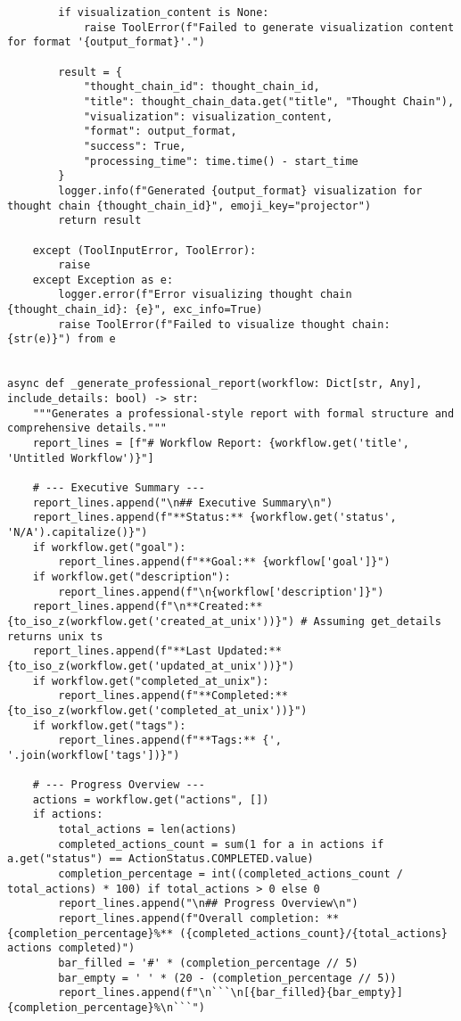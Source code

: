 \documentclass[12pt,a4paper]{article}
\begin{document}
\begin{pageablecode}
\begin{verbatim}
        if visualization_content is None:
            raise ToolError(f"Failed to generate visualization content for format '{output_format}'.")

        result = {
            "thought_chain_id": thought_chain_id,
            "title": thought_chain_data.get("title", "Thought Chain"),
            "visualization": visualization_content,
            "format": output_format,
            "success": True,
            "processing_time": time.time() - start_time
        }
        logger.info(f"Generated {output_format} visualization for thought chain {thought_chain_id}", emoji_key="projector")
        return result

    except (ToolInputError, ToolError):
        raise
    except Exception as e:
        logger.error(f"Error visualizing thought chain {thought_chain_id}: {e}", exc_info=True)
        raise ToolError(f"Failed to visualize thought chain: {str(e)}") from e


async def _generate_professional_report(workflow: Dict[str, Any], include_details: bool) -> str:
    """Generates a professional-style report with formal structure and comprehensive details."""
    report_lines = [f"# Workflow Report: {workflow.get('title', 'Untitled Workflow')}"]

    # --- Executive Summary ---
    report_lines.append("\n## Executive Summary\n")
    report_lines.append(f"**Status:** {workflow.get('status', 'N/A').capitalize()}")
    if workflow.get("goal"): 
        report_lines.append(f"**Goal:** {workflow['goal']}")
    if workflow.get("description"):
        report_lines.append(f"\n{workflow['description']}")
    report_lines.append(f"\n**Created:** {to_iso_z(workflow.get('created_at_unix'))}") # Assuming get_details returns unix ts
    report_lines.append(f"**Last Updated:** {to_iso_z(workflow.get('updated_at_unix'))}")
    if workflow.get("completed_at_unix"): 
        report_lines.append(f"**Completed:** {to_iso_z(workflow.get('completed_at_unix'))}")
    if workflow.get("tags"): 
        report_lines.append(f"**Tags:** {', '.join(workflow['tags'])}")

    # --- Progress Overview ---
    actions = workflow.get("actions", [])
    if actions:
        total_actions = len(actions)
        completed_actions_count = sum(1 for a in actions if a.get("status") == ActionStatus.COMPLETED.value)
        completion_percentage = int((completed_actions_count / total_actions) * 100) if total_actions > 0 else 0
        report_lines.append("\n## Progress Overview\n")
        report_lines.append(f"Overall completion: **{completion_percentage}%** ({completed_actions_count}/{total_actions} actions completed)")
        bar_filled = '#' * (completion_percentage // 5)
        bar_empty = ' ' * (20 - (completion_percentage // 5))
        report_lines.append(f"\n```\n[{bar_filled}{bar_empty}] {completion_percentage}%\n```")


\end{verbatim}
\end{pageablecode}
\end{document}
